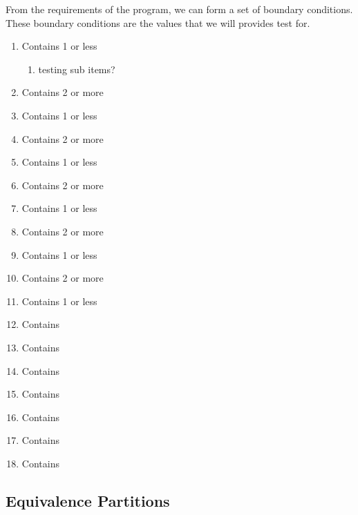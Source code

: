 \documentclass[12pt,letterpaper]{article}
\begin{document}
From the requirements of the program, we can form a set of boundary conditions. These
boundary conditions are the values that we will provides test for.

\begin{enumerate}
\item Contains 1 or less
\begin{enumerate}
\item testing sub items?
\end{enumerate}
\item Contains 2 or more 
\item Contains 1 or less
\item Contains 2 or more 
\item Contains 1 or less
\item Contains 2 or more 
\item Contains 1 or less
\item Contains 2 or more 
\item Contains 1 or less
\item Contains 2 or more 
\item Contains 1 or less
\item Contains
\item Contains
\item Contains
\item Contains
\item Contains
\item Contains
\item Contains
\end{enumerate}




\subsection{Equivalence Partitions}
\end{document}
